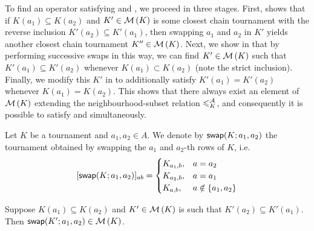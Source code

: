 To find an operator satisfying \chainmin{} and \mon{}, we
proceed in three stages. First,  shows
that if $K(a_1) \subseteq K(a_2)$ and $K' \in \operatorname{\mathcal{M}}\left({K}\right)$ is some closest chain
tournament with the reverse inclusion $K'(a_2) \subseteq K'(a_1)$, then
swapping $a_1$ and $a_2$ in $K'$ yields another closest chain tournament
$K'' \in \operatorname{\mathcal{M}}\left({K}\right)$. Next, we show in
 that by performing
successive swaps in this way, we can find $K' \in \operatorname{\mathcal{M}}\left({K}\right)$ such that $K'(a_1)
\subseteq K'(a_2)$ whenever $K(a_1) \subset K(a_2)$ (note the strict
inclusion). Finally, we modify this $K'$ in
 to additionally satisfy $K'(a_1) =
K'(a_2)$ whenever $K(a_1) = K(a_2)$.  This shows that there always exist an
element of $\operatorname{\mathcal{M}}\left({K}\right)$ extending the neighbourhood-subset relation $\leqslant^{\mathcal{A}}_K$,
and consequently it is possible to satisfy \chainmin{} and
\mon{} simultaneously.

\begin{definition}
    Let $K$ be a tournament and $a_1, a_2 \in A$. We denote by
    $\mathsf{swap}({K}; {a_1}, {a_2})$ the tournament obtained by swapping the $a_1$ and
    $a_2$-th rows of $K$, i.e.
    \[
        [\mathsf{swap}({K}; {a_1}, {a_2})]_{ab} = \begin{cases}
            K_{a_1,b},& a = a_2 \\
            K_{a_2,b},& a = a_1 \\
            K_{a,b},& a \notin \{a_1,a_2\}
        \end{cases}
    \]
\end{definition}

\begin{lemma}
    \label{tourn_result_chainmin_mon_swapping}
    Suppose $K(a_1) \subseteq K(a_2)$ and $K' \in \operatorname{\mathcal{M}}\left({K}\right)$ is such that
    $K'(a_2) \subseteq K'(a_1)$. Then $\mathsf{swap}({K'}; {a_1}, {a_2}) \in \operatorname{\mathcal{M}}\left({K}\right)$.
\end{lemma}

\def\xset{(-1, 0) circle (1cm)}
\def\yset{(1, 0) circle (1cm)}
\def\xprimeset{(0, 1) circle (1cm)}
\def\yprimeset{(0, -1) circle (1cm)}
\newcommand{\setboundaries}{
    \draw \xset node {$X$};
    \draw \yset node {$Y$};
    \draw \xprimeset node {$X'$};
    \draw \yprimeset node {$Y'$};
}
\newcommand{\thiswithoutthose}[2]{
    \begin{scope}[even odd rule]
        \clip #2 (-2, -2) rectangle (2, 2);
        \fill[orange!60] #1;
    \end{scope}
}

